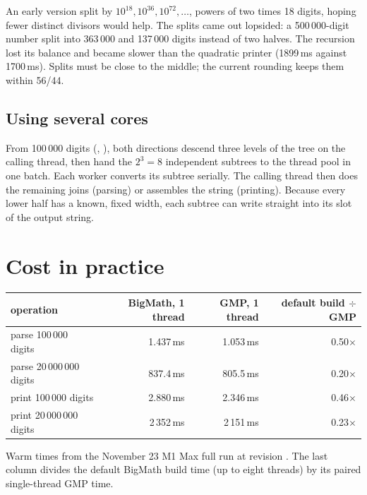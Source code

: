 \begin{pitfall}
An early version split by $10^{18}, 10^{36}, 10^{72}, \dots$, powers of two times 18 digits,
hoping fewer distinct divisors would help. The splits came out lopsided: a 500\,000-digit
number split into 363\,000 and 137\,000 digits instead of two halves. The recursion lost its
balance and became slower than the quadratic printer (1899\,ms against 1700\,ms). Splits must
be close to the middle; the current rounding keeps them within 56/44.
\end{pitfall}

\subsection{Using several cores}

From 100\,000 digits (,
), both directions descend three levels of the tree on
the calling thread, then hand the $2^3 = 8$ independent subtrees to the thread pool in one
batch. Each worker converts its subtree serially. The calling thread then does the remaining
joins (parsing) or assembles the string (printing). Because every lower half has a known,
fixed width, each subtree can write straight into its slot of the output string.

\section{Cost in practice}

\begin{center}
\small
\begin{tabular}{lrrr}
\toprule
operation & BigMath, 1 thread & GMP, 1 thread & default build $\div$ GMP \\
\midrule
parse 100\,000 digits & 1.437\,ms & 1.053\,ms & 0.50$\times$ \\
parse 20\,000\,000 digits & 837.4\,ms & 805.5\,ms & 0.20$\times$ \\
print 100\,000 digits & 2.880\,ms & 2.346\,ms & 0.46$\times$ \\
print 20\,000\,000 digits & 2\,352\,ms & 2\,151\,ms & 0.23$\times$ \\
\bottomrule
\end{tabular}

\smallskip
{\footnotesize Warm times from the November 23 M1 Max full run at revision
. The last column divides the default BigMath build time
(up to eight threads) by its paired single-thread GMP time.}
\end{center}

